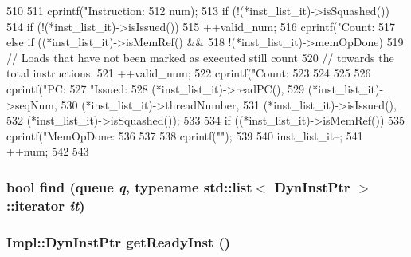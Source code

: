 \begin{DoxyCode}
{510     {
511         cprintf("Instruction:%
512                 num);
513         if (!(*inst_list_it)->isSquashed()) {
514             if (!(*inst_list_it)->isIssued()) {
515                 ++valid_num;
516                 cprintf("Count:%
517             } else if ((*inst_list_it)->isMemRef() &&
518                        !(*inst_list_it)->memOpDone) {
519                 // Loads that have not been marked as executed still count
520                 // towards the total instructions.
521                 ++valid_num;
522                 cprintf("Count:%
523             }
524         }
525 
526         cprintf("PC:%
527                 "Issued:%
528                 (*inst_list_it)->readPC(),
529                 (*inst_list_it)->seqNum,
530                 (*inst_list_it)->threadNumber,
531                 (*inst_list_it)->isIssued(),
532                 (*inst_list_it)->isSquashed());
533 
534         if ((*inst_list_it)->isMemRef()) {
535             cprintf("MemOpDone:%
536         }
537 
538         cprintf("\n");
539 
540         inst_list_it--;
541         ++num;
542     }
543 }
\end{DoxyCode}
\hypertarget{classBackEnd_1_1InstQueue_aea2496e092fdfa5953ee18676dcc78da}{
\subsubsection[{find}]{\setlength{\rightskip}{0pt plus 5cm}bool find ({\bf queue} {\em q}, \/  typename {\bf std::list}$<$ {\bf DynInstPtr} $>$::iterator {\em it})}}
\label{classBackEnd_1_1InstQueue_aea2496e092fdfa5953ee18676dcc78da}
\hypertarget{classBackEnd_1_1InstQueue_adafbd3336dfa623082983831f3063993}{
\subsubsection[{getReadyInst}]{\setlength{\rightskip}{0pt plus 5cm}Impl::DynInstPtr getReadyInst ()}}
\label{classBackEnd_1_1InstQueue_adafbd3336dfa623082983831f3063993}



